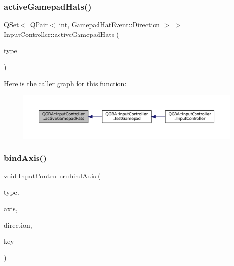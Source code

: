 \subsubsection{\texorpdfstring{active\+Gamepad\+Hats()}{activeGamepadHats()}}
{\footnotesize\ttfamily Q\+Set$<$ Q\+Pair$<$ \mbox{\hyperlink{ioapi_8h_a787fa3cf048117ba7123753c1e74fcd6}{int}}, \mbox{\hyperlink{class_q_g_b_a_1_1_gamepad_hat_event_ae3f20662c61b054e5344aafb9d843837}{Gamepad\+Hat\+Event\+::\+Direction}} $>$ $>$ Input\+Controller\+::active\+Gamepad\+Hats (\begin{DoxyParamCaption}\item[{\mbox{\hyperlink{ioapi_8h_a787fa3cf048117ba7123753c1e74fcd6}{int}}}]{type }\end{DoxyParamCaption})}

Here is the caller graph for this function\+:
\nopagebreak
\begin{figure}[H]
\begin{center}
\leavevmode
\includegraphics[width=350pt]{class_q_g_b_a_1_1_input_controller_ae9df370f0ec15e1246859fd24e5da0ee_icgraph}
\end{center}
\end{figure}
\mbox{\label{class_q_g_b_a_1_1_input_controller_a3d393ba04e9b5671104d93dad40f495b}} 
\subsubsection{\texorpdfstring{bind\+Axis()}{bindAxis()}}
{\footnotesize\ttfamily void Input\+Controller\+::bind\+Axis (\begin{DoxyParamCaption}\item[{uint32\+\_\+t}]{type,  }\item[{\mbox{\hyperlink{ioapi_8h_a787fa3cf048117ba7123753c1e74fcd6}{int}}}]{axis,  }\item[{\mbox{\hyperlink{class_q_g_b_a_1_1_gamepad_axis_event_a5d50ab74dce4e58252f2affb5f227bbc}{Gamepad\+Axis\+Event\+::\+Direction}}}]{direction,  }\item[{G\+B\+A\+Key}]{key }\end{DoxyParamCaption})}

